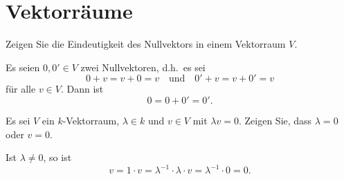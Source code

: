 \section{Vektorräume}


\begin{question}
 Zeigen Sie die Eindeutigkeit des Nullvektors in einem Vektorraum $V$.
\end{question}
\begin{solution}
 Es seien $0, 0' \in V$ zwei Nullvektoren, d.h.\ es sei
 \[
  0 + v = v + 0 = v \quad \text{und} \quad 0' + v = v + 0' = v
 \]
 für alle $v \in V$. Dann ist
 \[
  0 = 0 + 0' = 0'.
 \]
\end{solution}


\begin{question}
 Es sei $V$ ein $k$-Vektorraum, $\lambda \in k$ und $v \in V$ mit $\lambda v = 0$. Zeigen Sie, dass $\lambda = 0$ oder $v = 0$.
\end{question}
\begin{solution}
 Ist $\lambda \neq 0$, so ist
 \[
  v = 1 \cdot v = \lambda^{-1} \cdot \lambda \cdot v = \lambda^{-1} \cdot 0 = 0.
 \]
\end{solution}





